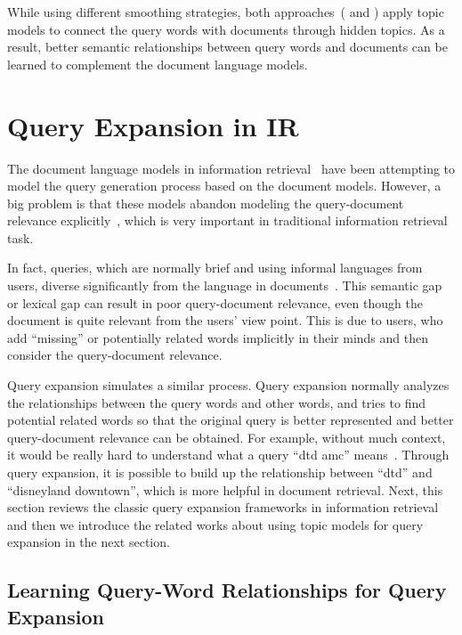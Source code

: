 While using different smoothing strategies, both
approaches~(\citep{wei-06} and \citep{Lu-2011}) apply topic models to
connect the query words with documents through hidden topics. As a
result, better semantic relationships between query words and
documents can be learned to complement the document language models.


\section{Query Expansion in IR}

The document language models in information
retrieval~\citep{PonteCroft} have been attempting to model the query
generation process based on the document models. However, a big
problem is that these models abandon modeling the query-document
relevance explicitly~\citep{Lavrenko-2001}, which is very important in
traditional information retrieval task.

In fact, queries, which are normally brief and using informal
languages from users, diverse significantly from the language in
documents~\citep{Muller-2009}. This semantic gap or lexical gap can
result in poor query-document relevance, even though the document is
quite relevant from the users' view point. This is due to users, who
add ``missing'' or potentially related words implicitly in their minds
and then consider the query-document relevance.

Query expansion simulates a similar process. Query expansion
normally analyzes the relationships between the query words and other
words, and tries to find potential related words so that the original
query is better represented and better query-document relevance can be
obtained. For example, without much context, it would be really hard 
to understand what a query ``dtd amc'' means~\citep{Jiang-2016}. Through
query expansion, it is possible to build up the relationship between ``dtd''
and ``disneyland downtown'', which is more helpful in document retrieval. 
Next, this section reviews the classic query expansion frameworks
in information retrieval and then we introduce the related works about
using topic models for query expansion in the next section.

\subsection{Learning Query-Word Relationships for Query Expansion}

